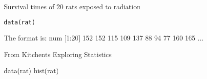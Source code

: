 \begin{Description}\relax
Survival times of 20 rats exposed to radiation
\end{Description}
\begin{Usage}
\begin{verbatim}data(rat)\end{verbatim}
\end{Usage}
\begin{Format}\relax
The format is:
num [1:20] 152 152 115 109 137 88 94 77 160 165 ...
\end{Format}
\begin{Source}\relax
From Kitchents Exploring Statistics
\end{Source}
\begin{Examples}
\begin{ExampleCode}
data(rat)
hist(rat)
\end{ExampleCode}
\end{Examples}

